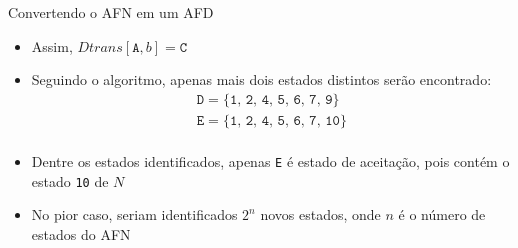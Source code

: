 \begin{frame}[fragile]{Convertendo o AFN em um AFD}

    \begin{itemize}
        \item Assim, $Dtrans[\texttt{A}, b] = \texttt{C}$
        \pause

        \item Seguindo o algoritmo, apenas mais dois estados distintos serão encontrado:
        \[
            \begin{array}{l}
                \texttt{D} = \{\texttt{1, 2, 4, 5, 6, 7, 9}\} \\
                \texttt{E} = \{\texttt{1, 2, 4, 5, 6, 7, 10}\} \\
            \end{array}
        \]
        \pause

        \item Dentre os estados identificados, apenas \texttt{E} é estado de aceitação, pois contém o estado \texttt{10} de $N$
        \pause

        \item No pior caso, seriam identificados $2^n$ novos estados, onde $n$ é o número de estados do AFN
    \end{itemize}

\end{frame}

